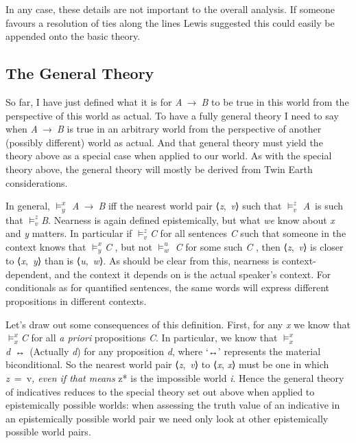 \documentclass[
  11pt,
  letterpaper,
  DIV=11,
  numbers=noendperiod,
  twoside]{scrartcl}
\begin{document}
In any case, these details are not important to the overall analysis. If
someone favours a resolution of ties along the lines Lewis suggested
this could easily be appended onto the basic theory.

\subsection{The General Theory}\label{the-general-theory}

So far, I have just defined what it is for \emph{A}~→~\emph{B} to be
true in this world from the perspective of this world as actual. To have
a fully general theory I need to say when \emph{A}~→~\emph{B} is true in
an arbitrary world from the perspective of another (possibly different)
world as actual. And that general theory must yield the theory above as
a special case when applied to our world. As with the special theory
above, the general theory will mostly be derived from Twin Earth
considerations.

In general, \(\vDash_y^x\) \emph{A}~→~\emph{B} iff the nearest world
pair ⟨\emph{z},~\emph{v}⟩ such that \(\vDash_v^z\) \emph{A}~is such that
\(\vDash_v^z\)\emph{B}. Nearness is again defined epistemically, but
what \emph{we} know about \emph{x} and \emph{y} matters. In particular
if \(\vDash_v^z\)\emph{C} for all sentences \emph{C} such that someone
in the context knows that \(\vDash_y^x\)\emph{C} , but not
\(\vDash_w^u\) \emph{C} for some such \emph{C} , then
⟨\emph{z},~\emph{v}⟩ is closer to ⟨\emph{x},~\emph{y}⟩ than is
⟨\emph{u},~\emph{w}⟩. As should be clear from this, nearness is
context-dependent, and the context it depends on is the actual speaker's
context. For conditionals as for quantified sentences, the same words
will express different propositions in different contexts.

Let's draw out some consequences of this definition. First, for any
\emph{x} we know that \(\vDash_x^x\)\emph{C} for all \emph{a priori}
propositions \emph{C}. In particular, we know that
\(\vDash_x^x\)\emph{d}~↔~(Actually \emph{d}) for any proposition
\emph{d}, where `↔' represents the material biconditional. So the
nearest world pair ⟨\emph{z},~\emph{v}⟩ to ⟨\emph{x}, \emph{x}⟩ must be
one in which \emph{z}~=~v\emph{, even if that means }z* is the
impossible world \emph{i}. Hence the general theory of indicatives
reduces to the special theory set out above when applied to
epistemically possible worlds: when assessing the truth value of an
indicative in an epistemically possible world pair we need only look at
other epistemically possible world pairs.
\end{document}
